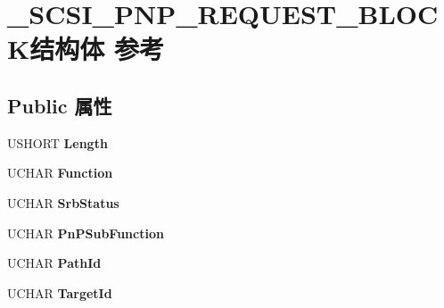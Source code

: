 \hypertarget{struct___s_c_s_i___p_n_p___r_e_q_u_e_s_t___b_l_o_c_k}{}\section{\+\_\+\+S\+C\+S\+I\+\_\+\+P\+N\+P\+\_\+\+R\+E\+Q\+U\+E\+S\+T\+\_\+\+B\+L\+O\+C\+K结构体 参考}
\label{struct___s_c_s_i___p_n_p___r_e_q_u_e_s_t___b_l_o_c_k}
\subsection*{Public 属性}
\begin{DoxyCompactItemize}
\item 
\mbox{\label{struct___s_c_s_i___p_n_p___r_e_q_u_e_s_t___b_l_o_c_k_a401585d28e64c05d300a57140ef514fc}} 
U\+S\+H\+O\+RT {\bfseries Length}
\item 
\mbox{\label{struct___s_c_s_i___p_n_p___r_e_q_u_e_s_t___b_l_o_c_k_a3ffc8f64b50ce25758b5c8544adbc8a8}} 
U\+C\+H\+AR {\bfseries Function}
\item 
\mbox{\label{struct___s_c_s_i___p_n_p___r_e_q_u_e_s_t___b_l_o_c_k_a0160ab818acb41a3040a70ad2df6a6bc}} 
U\+C\+H\+AR {\bfseries Srb\+Status}
\item 
\mbox{\label{struct___s_c_s_i___p_n_p___r_e_q_u_e_s_t___b_l_o_c_k_a3e972fd3db54f719848db391c69f10c5}} 
U\+C\+H\+AR {\bfseries Pn\+P\+Sub\+Function}
\item 
\mbox{\label{struct___s_c_s_i___p_n_p___r_e_q_u_e_s_t___b_l_o_c_k_a5161c271e1584c8877cad883ee1e9db3}} 
U\+C\+H\+AR {\bfseries Path\+Id}
\item 
\mbox{\label{struct___s_c_s_i___p_n_p___r_e_q_u_e_s_t___b_l_o_c_k_ac16e1c5a8acd2c53a4a1b77ddbca89d0}} 
U\+C\+H\+AR {\bfseries Target\+Id}
\item 
\mbox{\label{struct___s_c_s_i___p_n_p___r_e_q_u_e_s_t___b_l_o_c_k_a2d477d96f7f9b0e7535ac2d443b98005}} 

\end{DoxyCompactItemize}
